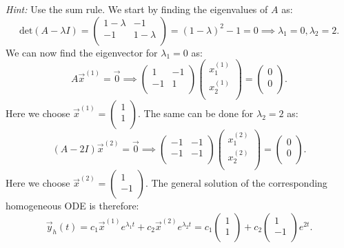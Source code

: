 \textit{Hint:} Use the sum rule.
\bigbreak
We start by finding the eigenvalues of $A$ as:
\[ 
\mathrm{det}(A - \lambda I) = \begin{pmatrix}
1 - \lambda & -1\\
-1 & 1 -\lambda\\
\end{pmatrix} = \left( 1-\lambda \right)^2 -1 = 0 \implies \lambda_1 = 0, \lambda_2 = 2
.\]
We can now find the eigenvector for $\lambda_1 = 0$ as:
\[ 
A \Vec{x}^{(1)} = \Vec{0} \implies \begin{pmatrix}
1 & -1\\
-1 & 1\\
\end{pmatrix} \begin{pmatrix}
x_1^{(1)}\\
x_2^{(1)}\\
\end{pmatrix} = \begin{pmatrix}
0\\
0\\
\end{pmatrix}
.\]
Here we choose $\Vec{x}^{(1)} = \begin{pmatrix}
1\\
1\\
\end{pmatrix}$. The same can be done for $\lambda_2 = 2$ as:
\[ 
  (A-2I) \Vec{x}^{(2)} = \Vec{0} \implies \begin{pmatrix}
  -1 & -1\\
  -1 & -1\\
  \end{pmatrix} \begin{pmatrix}
  x_1^{(2)}\\
  x_2^{(2)}\\
  \end{pmatrix} = \begin{pmatrix}
  0\\
  0\\
  \end{pmatrix}
.\]
Here we choose $\Vec{x}^{(2)} = \begin{pmatrix}
1\\
-1\\
\end{pmatrix}$. The general solution of the corresponding homogeneous ODE is therefore:
\[ 
\Vec{y}_h(t) = c_1 \Vec{x}^{(1)} e^{\lambda_1 t} + c_2 \Vec{x}^{(2)} e^{\lambda_2 t} = c_1 \begin{pmatrix}
1\\
1\\
\end{pmatrix} + c_2 \begin{pmatrix}
1\\
-1\\
\end{pmatrix} e^{2t}
.\]
